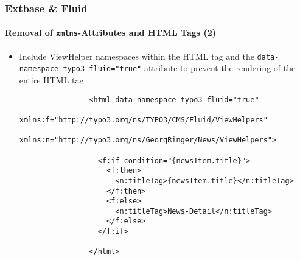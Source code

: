 \begin{frame}[fragile]
	\frametitle{Extbase \& Fluid}
	\framesubtitle{Removal of \texttt{xmlns}-Attributes and HTML Tags (2)}

	\lstset{basicstyle=\tiny\ttfamily}

	\begin{itemize}

		\item Include ViewHelper namespaces within the HTML tag and the
			\texttt{data-namespace-typo3-fluid="true"} attribute to prevent the rendering
			of the entire HTML tag

			\begin{lstlisting}
				<html data-namespace-typo3-fluid="true"
				  xmlns:f="http://typo3.org/ns/TYPO3/CMS/Fluid/ViewHelpers"
				  xmlns:n="http://typo3.org/ns/GeorgRinger/News/ViewHelpers">

				  <f:if condition="{newsItem.title}">
				    <f:then>
				      <n:titleTag>{newsItem.title}</n:titleTag>
				    </f:then>
				    <f:else>
				      <n:titleTag>News-Detail</n:titleTag>
				    </f:else>
				  </f:if>

				</html>
			\end{lstlisting}

	\end{itemize}

\end{frame}


